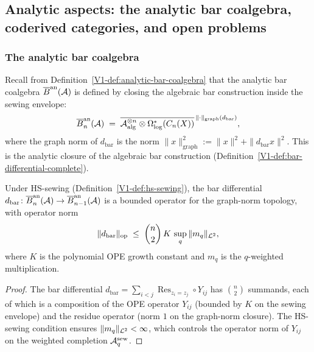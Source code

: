 %
%

\subsection{Analytic aspects: the analytic bar coalgebra,
coderived categories, and open problems}

\subsubsection{The analytic bar coalgebra}

\begin{definition}%
%
Recall from Definition~\ref{V1-def:analytic-bar-coalgebra} that the
analytic bar coalgebra $\overline{B}^{\mathrm{an}}(\mathcal{A})$ is defined by closing
the algebraic bar construction inside the sewing envelope:
\[
\overline{B}^{\mathrm{an}}_n(\mathcal{A})
\;=\;
\overline{
\mathcal{A}_{\mathrm{alg}}^{\otimes n}
\otimes \Omega^*_{\log}(C_n(X))
}^{\,\|\cdot\|_{\mathrm{graph}}(d_{\mathrm{bar}})},
\]
where the graph norm of $d_{\mathrm{bar}}$ is the norm
$\|x\|_{\mathrm{graph}}^2 := \|x\|^2 + \|d_{\mathrm{bar}} x\|^2$.
This is the analytic closure of the algebraic bar construction
(Definition~\ref*{V1-def:bar-differential-complete}).
\end{definition}

\begin{proposition}%
%
Under HS-sewing \textup{(}Definition~\textup{\ref{V1-def:hs-sewing}}\textup{)},
the bar differential $d_{\mathrm{bar}} \colon \overline{B}^{\mathrm{an}}_n(\mathcal{A}) \to
\overline{B}^{\mathrm{an}}_{n-1}(\mathcal{A})$ is a bounded operator for the graph-norm
topology, with operator norm
\begin{equation}%
\|d_{\mathrm{bar}}\|_{\mathrm{op}}
\;\leq\;
\binom{n}{2}\,K\,\sup_q \|m_q\|_{\hscl},
\end{equation}
where $K$ is the polynomial OPE growth constant and $m_q$ is the
$q$-weighted multiplication.
\end{proposition}

\begin{proof}
The bar differential $d_{\mathrm{bar}} = \sum_{i<j}
\operatorname{Res}_{z_i=z_j} \circ Y_{ij}$ has
$\binom{n}{2}$ summands, each of which is a composition of
the OPE operator $Y_{ij}$ (bounded by $K$ on the sewing envelope)
and the residue operator (norm $1$ on the graph-norm closure).
The HS-sewing condition ensures $\|m_q\|_{\mathcal{L}^2} < \infty$,
which controls the operator norm of $Y_{ij}$ on the weighted
completion $\mathcal{A}^{\mathrm{sew}}_q$.
\end{proof}


